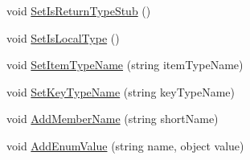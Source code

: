\begin{DoxyCompactItemize}
\item 
void \hyperlink{class_eli_log_in_app_1_1_eli_log_in_app___xaml_type_info_1_1_xaml_user_type_a90707b6102a07fad88fe220d29902a5f}{Set\+Is\+Return\+Type\+Stub} ()
\item 
void \hyperlink{class_eli_log_in_app_1_1_eli_log_in_app___xaml_type_info_1_1_xaml_user_type_aa272264ba98bdfdfd550dcc3914cad12}{Set\+Is\+Local\+Type} ()
\item 
void \hyperlink{class_eli_log_in_app_1_1_eli_log_in_app___xaml_type_info_1_1_xaml_user_type_aef80979457c3078752cdaf45a5fa27a4}{Set\+Item\+Type\+Name} (string item\+Type\+Name)
\item 
void \hyperlink{class_eli_log_in_app_1_1_eli_log_in_app___xaml_type_info_1_1_xaml_user_type_a73575a24633520fdf4fd1b3cd57a09bd}{Set\+Key\+Type\+Name} (string key\+Type\+Name)
\item 
void \hyperlink{class_eli_log_in_app_1_1_eli_log_in_app___xaml_type_info_1_1_xaml_user_type_af98e518e1be5e292f754d5f4e82ac1ef}{Add\+Member\+Name} (string short\+Name)
\item 
void \hyperlink{class_eli_log_in_app_1_1_eli_log_in_app___xaml_type_info_1_1_xaml_user_type_a1261e283fe193030c59f5df8e2fc74ac}{Add\+Enum\+Value} (string name, object value)
\end{DoxyCompactItemize}
